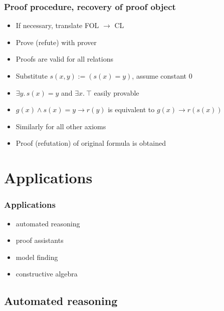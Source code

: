 \documentclass[handout,11pt]{beamer}
\newcommand{\imp}{\rightarrow}
\begin{document}
\begin{frame}
\frametitle{Proof procedure, recovery of proof object}
 \begin{itemize}[<+->]
    \item If necessary, translate FOL $\rightarrow$ CL
    \item Prove (refute) with prover
    \item Proofs are valid for all relations %
    \item Substitute $s(x,y) := (s(x) = y)$, assume constant $0$
    \item $\exists y.\,s(x)=y$ and $\exists x.~\top$ easily provable
    \item $g(x) \wedge s(x)=y \imp r(y)$ is equivalent to $g(x) \imp r(s(x))$
    \item Similarly for all other axioms
    \item Proof (refutation) of original formula is obtained
 \end{itemize}
\end{frame}


\section{Applications}

\begin{frame}
\frametitle{Applications}
 \begin{itemize}[<+->]   %
    \item automated reasoning
    \item proof assistants    
    \item model finding
    \item constructive algebra
 \end{itemize}
\end{frame}

\subsection{Automated reasoning}
\end{document}
